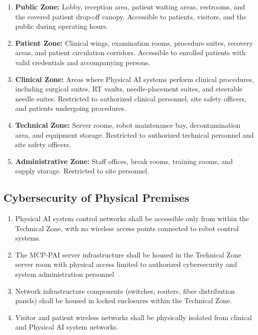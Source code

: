 \begin{enumerate}[label=(\alph*)]
\item \textbf{Public Zone:} Lobby, reception area, patient waiting areas,
  restrooms, and the covered patient drop-off canopy. Accessible to patients,
  visitors, and the public during operating hours.

\item \textbf{Patient Zone:} Clinical wings, examination rooms, procedure
  suites, recovery areas, and patient circulation corridors. Accessible to
  enrolled patients with valid credentials and accompanying persons.

\item \textbf{Clinical Zone:} Areas where Physical AI systems perform clinical
  procedures, including surgical suites, RT vaults, needle-placement suites,
  and steerable needle suites. Restricted to authorized clinical personnel,
  site safety officers, and patients undergoing procedures.

\item \textbf{Technical Zone:} Server rooms, robot maintenance bay,
  decontamination area, and equipment storage. Restricted to authorized
  technical personnel and site safety officers.

\item \textbf{Administrative Zone:} Staff offices, break rooms, training rooms,
  and supply storage. Restricted to site personnel.
\end{enumerate}

\subsection{Cybersecurity of Physical Premises}

\begin{enumerate}[label=(\alph*)]
\item Physical AI system control networks shall be accessible only from within
  the Technical Zone, with no wireless access points connected to robot control
  systems.

\item The MCP-PAI server infrastructure shall be housed in the Technical Zone
  server room with physical access limited to authorized cybersecurity and
  system administration personnel~\cite{iche6r3adapt}.

\item Network infrastructure components (switches, routers, fiber distribution
  panels) shall be housed in locked enclosures within the Technical Zone.

\item Visitor and patient wireless networks shall be physically isolated from
  clinical and Physical AI system networks.
\end{enumerate}

